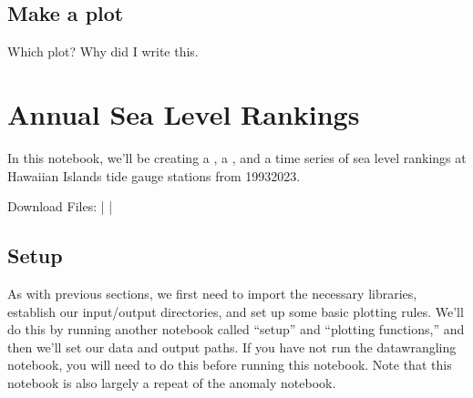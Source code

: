 \documentclass[letterpaper,10pt,english]{jupyterBook}
\begin{document}
\subsection{Make a plot}
\label{\detokenize{notebooks/regional_and_local/SL_anomaly_annual:make-a-plot}}
\sphinxAtStartPar
Which plot? Why did I write this.

\sphinxstepscope


\section{Annual Sea Level Rankings}
\label{\detokenize{notebooks/regional_and_local/SL_Rankings_annual:annual-sea-level-rankings}}\label{\detokenize{notebooks/regional_and_local/SL_Rankings_annual::doc}}
\begin{figure}[htbp]
\centering

\noindent{}
\end{figure}

\sphinxAtStartPar
In this notebook, we’ll be creating a {\hyperref[\detokenize{notebooks/regional_and_local/SL_Rankings_annual:sl-rankings-results}]{}}, a {\hyperref[\detokenize{notebooks/regional_and_local/SL_Rankings_annual:SL_rankings_map}]{}}, and a time series {\hyperref[\detokenize{notebooks/regional_and_local/SL_Rankings_annual:sl-rankings-timeseries}]{}} of sea level rankings at Hawaiian Islands tide gauge stations from 1993\sphinxhyphen{}2023.

\sphinxAtStartPar
Download Files:
 |
 |


\subsection{Setup}
\label{\detokenize{notebooks/regional_and_local/SL_Rankings_annual:setup}}
\sphinxAtStartPar
As with previous sections, we first need to import the necessary libraries, establish our input/output directories, and set up some basic plotting rules. We’ll do this by running another notebook called “setup” and “plotting functions,” and then we’ll set our data and output paths. If you have not run the datawrangling notebook, you will need to do this before running this notebook. Note that this notebook is also largely a repeat of the anomaly notebook.
\end{document}
